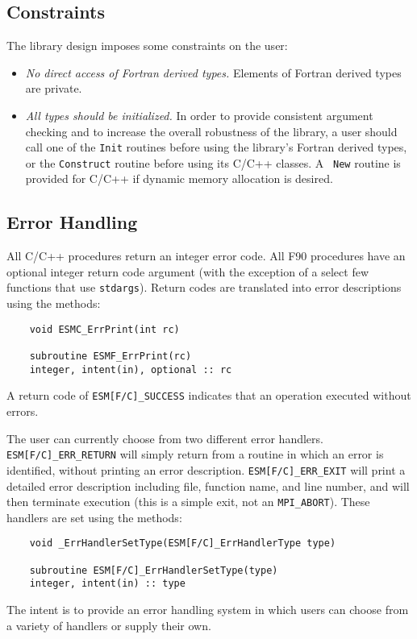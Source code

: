 \subsection{Constraints}

The library design imposes some constraints on the user:

\begin{itemize}
\item {\it No direct access of Fortran derived types.} Elements of
  Fortran derived types are private.
  
\item{\it All types should be initialized.} In order to provide
  consistent argument checking and to increase the overall robustness
  of the library, a user should call one of the {\tt Init}
  routines before using the library's Fortran derived types, or the
  {\tt Construct} routine before using its C/C++ classes.  A {\tt
    New} routine is provided for C/C++ if dynamic memory
  allocation is desired.

\end{itemize}

\subsection{Error Handling}

All C/C++ procedures return an integer error code.  All F90 procedures have 
an optional integer return code argument (with the exception of a select few
functions that use {\tt stdargs}).  Return codes are translated 
into error descriptions using the methods: 

\begin{verbatim}
    void ESMC_ErrPrint(int rc)

    subroutine ESMF_ErrPrint(rc)  
    integer, intent(in), optional :: rc
\end{verbatim}

A return code of {\tt ESM[F/C]\_SUCCESS} indicates that an 
operation executed without errors.

The user can currently choose from two different error handlers.
{\tt ESM[F/C]\_ERR\_RETURN} will simply return from a routine in which an error 
is identified, without printing an error description.
{\tt ESM[F/C]\_ERR\_EXIT} will print a detailed error description including
file, function name, and line number, and will then terminate execution
(this is a simple exit, not an {\tt MPI\_ABORT}).  These handlers are set 
using the methods: 
\begin{verbatim}
    void _ErrHandlerSetType(ESM[F/C]_ErrHandlerType type)

    subroutine ESM[F/C]_ErrHandlerSetType(type)
    integer, intent(in) :: type
\end{verbatim}

The intent is to provide an error handling system in which
users can choose from a variety of handlers or supply their own.









